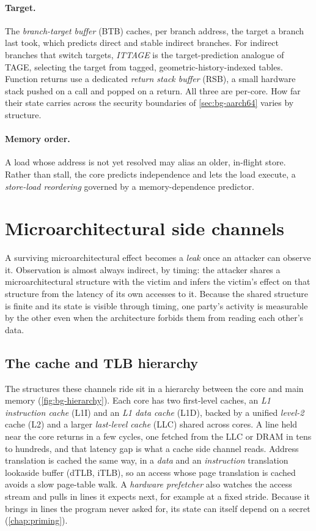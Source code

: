 \paragraph{Target.} The \emph{branch-target buffer} (BTB) caches, per branch address, the target a
branch last took, which predicts direct and stable indirect branches. For indirect branches that
switch targets, \emph{ITTAGE} is the target-prediction analogue of TAGE, selecting the target from
tagged, geometric-history-indexed tables. Function returns use a dedicated \emph{return stack
buffer} (RSB), a small hardware stack pushed on a call and popped on a return. All three are
per-core. How far their state carries across the security boundaries of \autoref{sec:bg-aarch64}
varies by structure.

\paragraph{Memory order.} A load whose address is not yet resolved may alias an older, in-flight
store. Rather than stall, the core predicts independence and lets the load execute, a
\emph{store-load reordering} governed by a memory-dependence predictor.

\section{Microarchitectural side channels}
\label{sec:bg-sidechannels}

A surviving microarchitectural effect becomes a \emph{leak} once an attacker can observe it.
Observation is almost always indirect, by timing: the attacker shares a microarchitectural
structure with the victim and infers the victim's effect on that structure from the latency of
its own accesses to it. Because the shared structure is finite and its state is visible through
timing, one party's activity is measurable by the other even when the architecture forbids them
from reading each other's data.

\subsection{The cache and TLB hierarchy}
\label{sec:bg-hierarchy}

The structures these channels ride sit in a hierarchy between the core and main memory
(\autoref{fig:bg-hierarchy}). Each core has two first-level caches, an \emph{L1 instruction cache}
(L1I) and an \emph{L1 data cache} (L1D), backed by a unified \emph{level-2} cache (L2) and a larger
\emph{last-level cache} (LLC) shared across cores. A line held near the core returns in a few
cycles, one fetched from the LLC or DRAM in tens to hundreds, and that latency gap is what a cache
side channel reads. Address translation is cached the same way, in a \emph{data} and an
\emph{instruction} translation lookaside buffer (dTLB, iTLB), so an access whose page translation is
cached avoids a slow page-table walk. A \emph{hardware prefetcher} also watches the access stream and
pulls in lines it expects next, for example at a fixed stride. Because it brings in lines the program
never asked for, its state can itself depend on a secret (\autoref{chap:priming}).

